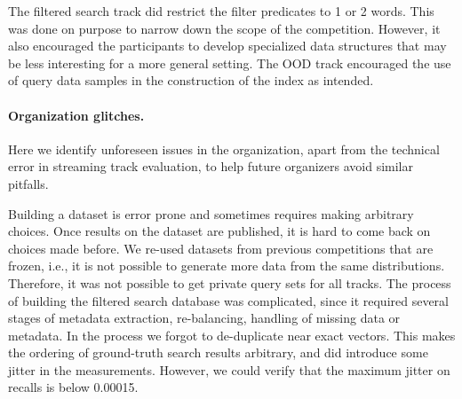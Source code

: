 

The filtered search track did restrict the filter predicates to 1 or 2 words. 
This was done on purpose to narrow down the scope of the competition. 
However, it also encouraged the participants to develop specialized data structures that may be less interesting for a more general setting. 
The OOD track encouraged the use of query data samples in the construction of the index as intended.


\paragraph{Organization glitches.}
Here we identify unforeseen issues in the organization, apart from the technical error in streaming track evaluation, to help future organizers avoid similar pitfalls. 

Building a dataset is error prone and sometimes requires making arbitrary choices. 
Once results on the dataset are published, it is hard to come back on choices made before. 
We re-used datasets from previous competitions that are frozen, i.e.,
it is not possible to generate more data from the same distributions. 
Therefore, it was not possible to get private query sets for all tracks. 
The process of building the filtered search database was complicated, since it required several stages
of metadata extraction, re-balancing, handling of missing data or metadata. 
In the process we forgot to de-duplicate near exact vectors. 
This makes the ordering of ground-truth search results arbitrary, and did introduce some jitter in the measurements. 
However, we could verify that the maximum jitter on recalls is below 0.00015. 

